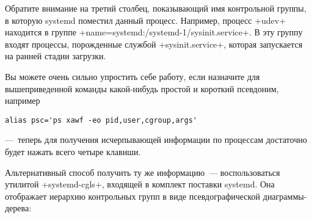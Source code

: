\documentclass[10pt,oneside,a4paper]{article}
\begin{document}
Обратите внимание на третий столбец, показывающий имя контрольной группы,
в которую systemd поместил данный процесс. Например, процесс +udev+
находится в группе +name=systemd:/systemd-1/sysinit.service+. В эту группу
входят процессы, порожденные службой +sysinit.service+, которая запускается
на ранней стадии загрузки.

Вы можете очень сильно упростить себе работу, если назначите для
вышеприведенной команды какой-нибудь простой и короткий псевдоним, например 
\begin{Verbatim}
alias psc='ps xawf -eo pid,user,cgroup,args'
\end{Verbatim}
---~теперь для получения исчерпывающей информации по процессам достаточно будет
нажать всего четыре клавиши.

Альтернативный способ получить ту же информацию~--- воспользоваться утилитой
+systemd-cgls+, входящей в комплект поставки systemd. Она отображает иерархию
контрольных групп в виде псевдографической диаграммы-дерева: 
\end{document}
